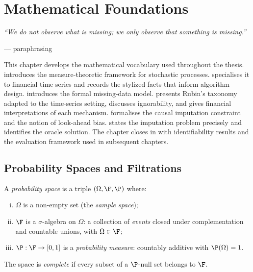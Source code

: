 \chapter{Mathematical Foundations}
\label{ch:foundations}

\epigraph{%
  \emph{``We do not observe what is missing; we only observe that something
  is missing.''}
}{--- paraphrasing \citet{little2019}}

This chapter develops the mathematical vocabulary used throughout the thesis.
 introduces the measure-theoretic framework for
stochastic processes.   specialises it to financial time
series and records the stylized facts that inform algorithm design.
 introduces the formal missing-data model.
 presents Rubin's taxonomy adapted to the time-series
setting, discusses ignorability, and gives financial interpretations of each
mechanism.   formalises the causal imputation
constraint and the notion of look-ahead bias.  
states the imputation problem precisely and identifies the oracle solution.
The chapter closes in  with
identifiability results and the evaluation framework used in subsequent
chapters.

\section{Probability Spaces and Filtrations}
\label{sec:prob_space}

\begin{definition}
\label{def:prob_space}
A \emph{probability space} is a triple $(\Omega,\F,\P)$ where:
\begin{enumerate}[(i)]
  \item $\Omega$ is a non-empty set (the \emph{sample space});
  \item $\F$ is a $\sigma$-algebra on $\Omega$: a collection of
        \emph{events} closed under complementation and countable unions,
        with $\Omega\in\F$;
  \item $\P:\F\to[0,1]$ is a \emph{probability measure}: countably additive
        with $\P(\Omega)=1$.
\end{enumerate}
The space is \emph{complete} if every subset of a $\P$-null set belongs
to $\F$.
\end{definition}


